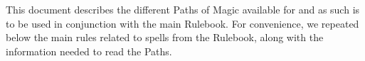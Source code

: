 \newcommand{\titlepagerighticons}{%
\texttt{[image: \\cosmologyicon]}

\vspace*{\spacebetweeniconrows}

\texttt{[image: \\druidismicon]}

\vspace*{\spacebetweeniconrows}

\texttt{[image: \\occultismicon]}

\vspace*{\spacebetweeniconrows}

\texttt{[image: \\shamanismicon]}

\vspace*{\spacebetweeniconrows}

\texttt{[image: \\witchcrafticon]}
}

\def\thereisachangelog{} %


\newcommand{\tableofcontentsInitials}{Contents}
\newcommand{\summariesInitials}{Summary}

\newcommand{\characteronly}{Character only}












This document describes the different Paths of Magic available for \nameofthegame{} and as such is to be used in conjunction with the main Rulebook. For convenience, we repeated below the main rules related to spells from the Rulebook, along with the information needed to read the Paths.

\vspace*{5pt}

